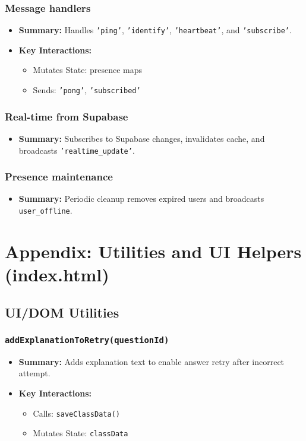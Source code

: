 \documentclass[11pt,letterpaper]{article}
\begin{document}
\subsubsection{Message handlers}
\begin{itemize}
    \item \textbf{Summary:} Handles \texttt{'ping'}, \texttt{'identify'}, \texttt{'heartbeat'}, and \texttt{'subscribe'}.
    \item \textbf{Key Interactions:}
    \begin{itemize}
        \item Mutates State: presence maps
        \item Sends: \texttt{'pong'}, \texttt{'subscribed'}
    \end{itemize}
\end{itemize}

\subsubsection{Real-time from Supabase}
\begin{itemize}
    \item \textbf{Summary:} Subscribes to Supabase changes, invalidates cache, and broadcasts \texttt{'realtime\_update'}.
\end{itemize}

\subsubsection{Presence maintenance}
\begin{itemize}
    \item \textbf{Summary:} Periodic cleanup removes expired users and broadcasts \texttt{user\_offline}.
\end{itemize}

\section{Appendix: Utilities and UI Helpers (index.html)}

\subsection{UI/DOM Utilities}

\subsubsection{\texttt{addExplanationToRetry(questionId)}}
\begin{itemize}
    \item \textbf{Summary:} Adds explanation text to enable answer retry after incorrect attempt.
    \item \textbf{Key Interactions:}
    \begin{itemize}
        \item Calls: \texttt{saveClassData()}
        \item Mutates State: \texttt{classData}
    \end{itemize}
\end{itemize}
\end{document}
